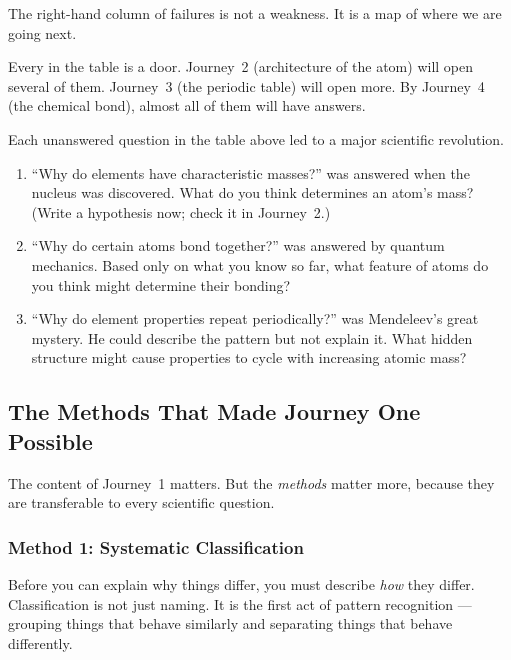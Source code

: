 \documentclass[12pt, a4paper]{book}
\theoremstyle{definition}
\begin{document}
\vspace{0.5em}

The right-hand column of failures is not a weakness.
It is a map of where we are going next.

Every  in the table is a door.
Journey~2 (architecture of the atom) will open several of them.
Journey~3 (the periodic table) will open more.
By Journey~4 (the chemical bond), almost all of them
will have answers.

\begin{puzzlebox}
Each unanswered question in the table above
led to a major scientific revolution.

\begin{enumerate}[label=(\alph*), leftmargin=*]
  \item ``Why do elements have characteristic masses?''
        was answered when the nucleus was discovered.
        What do you think determines an atom's mass?
        (Write a hypothesis now; check it in Journey~2.)

  \item ``Why do certain atoms bond together?''
        was answered by quantum mechanics.
        Based only on what you know so far, what feature
        of atoms do you think might determine their bonding?

  \item ``Why do element properties repeat periodically?''
        was Mendeleev's great mystery.
        He could describe the pattern but not explain it.
        What hidden structure might cause properties
        to cycle with increasing atomic mass?
\end{enumerate}
\end{puzzlebox}

\subsection{The Methods That Made Journey One Possible}

The content of Journey~1 matters.
But the \emph{methods} matter more,
because they are transferable to every scientific question.

\subsubsection{Method 1: Systematic Classification}

Before you can explain why things differ,
you must describe \emph{how} they differ.
Classification is not just naming.
It is the first act of pattern recognition ---
grouping things that behave similarly
and separating things that behave differently.
\end{document}
